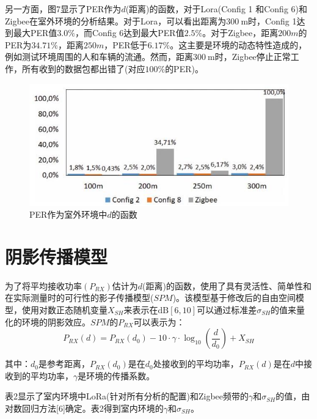 \documentclass[10pt]{ctexart}
\begin{document}
另一方面，图7显示了PER作为$d$(距离)的函数，对于Lora(Config 1 和Config 6)和 Zigbee在室外环境的分析结果。对于Lora，可以看出距离为$300\mathrm{~m}$时，Config 1达到最大PER值$3.0\%$，而Config 6达到最大PER值$2.5\%$。对于Zigbee，距离$200m$的PER为$34.71\%$，距离$250m$，PER低于$6.17\%$。这主要是环境的动态特性造成的，例如测试环境周围的人和车辆的流通。然而，距离$300\mathrm{~m}$时，Zigbee停止正常工作，所有收到的数据包都出错了(对应$100\%$的PER)。

\begin{figure}[H]
  \centering
  \includegraphics[max width=\textwidth]{2022_02_28_100dc43db44c8290ce2ag-06(1)}
  \renewcommand{\figurename}{图}
  \caption{PER作为室外环境中$d$的函数}
\end{figure}

\section{阴影传播模型}
为了将平均接收功率$\left(P_{RX}\right)$估计为$d$(距离)的函数，使用了具有灵活性、简单性和在实际测量时的可行性的影子传播模型($SPM$)。该模型基于修改后的自由空间模型，使用对数正态随机变量$X_{SH}$来表示在$\mathrm{dB}[6,10]$可以通过标准差$\sigma_{SH}$的值来量化的环境的阴影效应。$SPM$的$P_{RX}$可以表示为：
$$
P_{RX}(d)=P_{RX}\left(d_{0}\right)-10 \cdot \gamma \cdot \log _{10}\left(\frac{d}{d_{0}}\right)+X_{SH}
$$

其中：$d_{0}$是参考距离，$P_{RX}\left(d_{0}\right)$是在$d_{0}$处接收到的平均功率，$P_{RX}(d)$是在$d$中接收到的平均功率，$\gamma$是环境的传播系数。

表2显示了室内环境中LoRa(针对所有分析的配置)和Zigbee频带的$\gamma$和$\sigma_{SH}$的值，由对数回归方法[6]确定。表2得到室内环境的$\gamma$和$\sigma_{SH}$。
\end{document}
